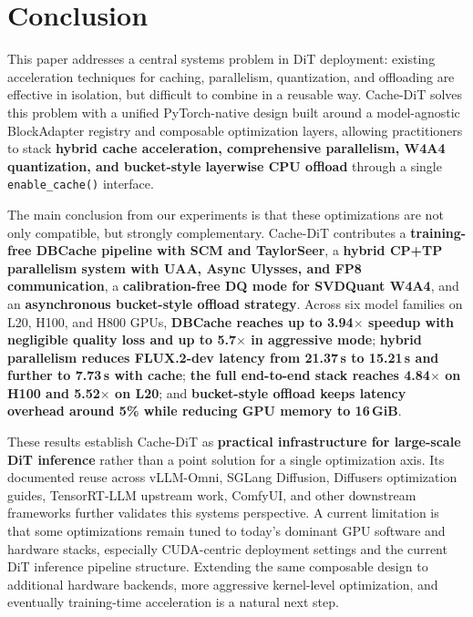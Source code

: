 \documentclass[10pt]{article}
\begin{document}
\section{Conclusion}

This paper addresses a central systems problem in DiT deployment: existing acceleration techniques for caching, parallelism, quantization, and offloading are effective in isolation, but difficult to combine in a reusable way. Cache-DiT solves this problem with a unified PyTorch-native design built around a model-agnostic BlockAdapter registry and composable optimization layers, allowing practitioners to stack \textbf{hybrid cache acceleration, comprehensive parallelism, W4A4 quantization, and bucket-style layerwise CPU offload} through a single \texttt{enable\_cache()} interface.

The main conclusion from our experiments is that these optimizations are not only compatible, but strongly complementary. Cache-DiT contributes a \textbf{training-free DBCache pipeline with SCM and TaylorSeer}, a \textbf{hybrid CP+TP parallelism system with UAA, Async Ulysses, and FP8 communication}, a \textbf{calibration-free DQ mode for SVDQuant W4A4}, and an \textbf{asynchronous bucket-style offload strategy}. Across six model families on L20, H100, and H800 GPUs, \textbf{DBCache reaches up to 3.94$\times$ speedup with negligible quality loss and up to 5.7$\times$ in aggressive mode}; \textbf{hybrid parallelism reduces FLUX.2-dev latency from 21.37\,s to 15.21\,s and further to 7.73\,s with cache}; \textbf{the full end-to-end stack reaches 4.84$\times$ on H100 and 5.52$\times$ on L20}; and \textbf{bucket-style offload keeps latency overhead around 5\% while reducing GPU memory to 16\,GiB}.

These results establish Cache-DiT as \textbf{practical infrastructure for large-scale DiT inference} rather than a point solution for a single optimization axis. Its documented reuse across vLLM-Omni, SGLang Diffusion, Diffusers optimization guides, TensorRT-LLM upstream work, ComfyUI, and other downstream frameworks further validates this systems perspective. A current limitation is that some optimizations remain tuned to today's dominant GPU software and hardware stacks, especially CUDA-centric deployment settings and the current DiT inference pipeline structure. Extending the same composable design to additional hardware backends, more aggressive kernel-level optimization, and eventually training-time acceleration is a natural next step.
\end{document}
